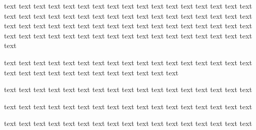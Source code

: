 \documentclass[twocolumn]{article}
\begin{document}
    text text text text text text text text text text text text text text text text text text text text text text text text text text text text text text text text text text text text text text text text text text text text text text text text text text text text text text text text text text text text text text text text text text text text text

    text text text text text text text text text text text text text text text text text text text text text text text text text text text text text

    text text text text text text text text text text text text text text text text text

    text text text text text text text text text text text text text text text text text

    text text text text text text text text text text text text text text text text text




\end{document}
